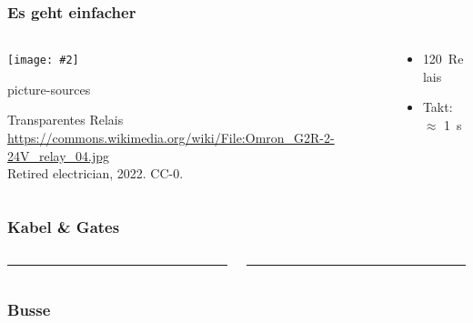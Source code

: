 \documentclass[c,aspectratio=169]{beamer}
\newcommand{\sourcedimage}[5][width=\textwidth,height=0.7\textheight,keepaspectratio]{%
  \begin{center}
    \texttt{[image: \#2]}

    \expandafter\begin{collect}{picture-sources}{}{}
      \item[#3] \href{#4}{#4} \\ #5
    \end{collect}
  \end{center}
}
\begin{document}
\begin{frame}
  \frametitle{Es geht einfacher}

  \begin{columns}
    \begin{column}{.45\textwidth}
      \sourcedimage{relay-transparent}{Transparentes Relais}{https://commons.wikimedia.org/wiki/File:Omron\_G2R-2-24V\_relay\_04.jpg}{Retired electrician, 2022. CC-0.}
    \end{column}
    \begin{column}{.45\textwidth}
      \begin{itemize}
      \item \qty{120} Relais
      \item Takt: $\approx$ \qty{1}{\second}
      \end{itemize}
    \end{column}
  \end{columns}
\end{frame}

\begin{frame}
  \frametitle{Kabel \& Gates}

  \begin{columns}
    \begin{column}{.45\textwidth}
      \hrule
    \end{column}
    \begin{column}{.45\textwidth}
      \hrule
    \end{column}
  \end{columns}
\end{frame}

\begin{frame}
  \frametitle{Busse}
\end{frame}
\end{document}
